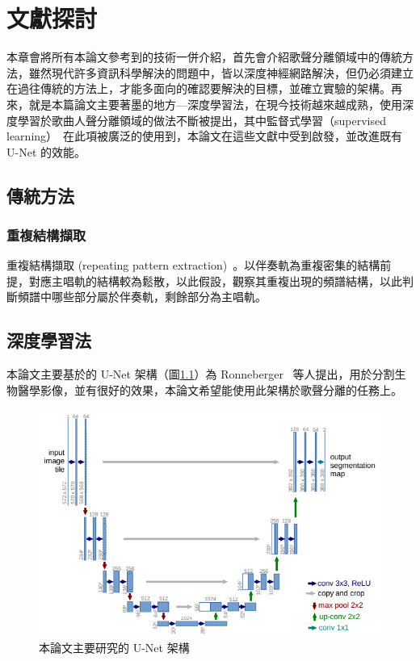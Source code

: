 \chapter{文獻探討}
本章會將所有本論文參考到的技術一併介紹，首先會介紹歌聲分離領域中的傳統方法，雖然現代許多資訊科學解決的問題中，皆以深度神經網路解決，但仍必須建立在過往傳統的方法上，才能多面向的確認要解決的目標，並確立實驗的架構。再來，就是本篇論文主要著墨的地方—深度學習法，在現今技術越來越成熟，使用深度學習於歌曲人聲分離領域的做法不斷被提出，其中監督式學習（supervised learning）~\cite{kotsiantis2007supervised}在此項被廣泛的使用到，本論文在這些文獻中受到啟發，並改進既有 U-Net 的效能。

\section{傳統方法}

\subsection{重複結構擷取}
重複結構擷取 (repeating pattern extraction)~\cite{rafii2012repeating}。以伴奏軌為重複密集的結構前提，對應主唱軌的結構較為鬆散，以此假設，觀察其重複出現的頻譜結構，以此判斷頻譜中哪些部分屬於伴奏軌，剩餘部分為主唱軌。

\section{深度學習法}
本論文主要基於的 U-Net 架構（圖\ref{ronneberger1}）為 Ronneberger~\cite{ronneberger2015u} 等人提出，用於分割生物醫學影像，並有很好的效果，本論文希望能使用此架構於歌聲分離的任務上。

\begin{figure}[htbp]
    \hfil
    \begin{minipage}[t]{1.0\textwidth}
        \includegraphics{./figures/chapter02_method/ronneberger1.png}
        \centering
        \caption {本論文主要研究的 U-Net 架構}
        \label{ronneberger1}
    \end{minipage}
    \hfil
\end{figure}

